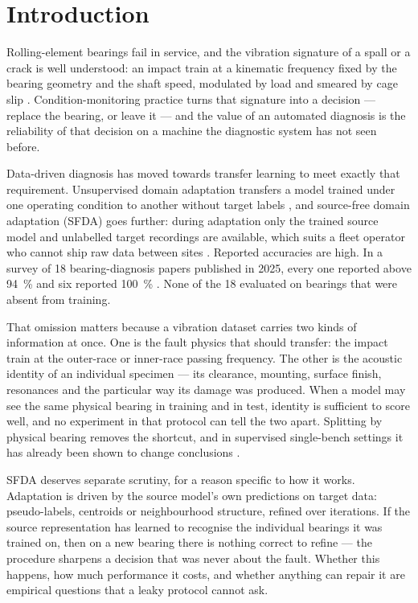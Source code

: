 \section{Introduction}
\label{sec:intro}

Rolling-element bearings fail in service, and the vibration signature of a spall or a crack is well understood: an impact
train at a kinematic frequency fixed by the bearing geometry and the shaft speed, modulated by load and smeared by cage slip
\cite{randall2011}. Condition-monitoring practice turns that signature into a decision --- replace the bearing, or leave it
--- and the value of an automated diagnosis is the reliability of that decision on a machine the diagnostic system has not
seen before.

Data-driven diagnosis has moved towards transfer learning to meet exactly that requirement. Unsupervised domain adaptation
transfers a model trained under one operating condition to another without target labels \cite{zhao2021udtl}, and source-free
domain adaptation (SFDA) goes further: during adaptation only the trained source model and unlabelled target recordings are
available, which suits a fleet operator who cannot ship raw data between sites \cite{liang2020shot,sdalr2025}. Reported
accuracies are high. In a survey of 18 bearing-diagnosis papers published in 2025, every one reported above
\SI{94}{\percent} and six reported \SI{100}{\percent} \cite{vieira2026}. None of the 18 evaluated on bearings that were
absent from training.

That omission matters because a vibration dataset carries two kinds of information at once. One is the fault physics that
should transfer: the impact train at the outer-race or inner-race passing frequency. The other is the acoustic identity of an
individual specimen --- its clearance, mounting, surface finish, resonances and the particular way its damage was produced.
When a model may see the same physical bearing in training and in test, identity is sufficient to score well, and no
experiment in that protocol can tell the two apart. Splitting by physical bearing removes the shortcut, and in supervised
single-bench settings it has already been shown to change conclusions \cite{hendriks2022,wheat2024leakage,vieira2026}.

SFDA deserves separate scrutiny, for a reason specific to how it works. Adaptation is driven by the source model's own
predictions on target data: pseudo-labels, centroids or neighbourhood structure, refined over iterations. If the source
representation has learned to recognise the individual bearings it was trained on, then on a new bearing there is nothing
correct to refine --- the procedure sharpens a decision that was never about the fault. Whether this happens, how much
performance it costs, and whether anything can repair it are empirical questions that a leaky protocol cannot ask.

